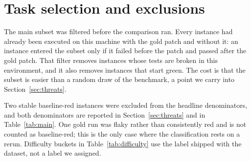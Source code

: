 \section{Task selection and exclusions}

The main subset was filtered before the comparison ran. Every instance had already been executed on this machine with the gold patch and without it: an instance entered the subset only if it failed before the patch and passed after the gold patch. That filter removes instances whose tests are broken in this environment, and it also removes instances that start green. The cost is that the subset is easier than a random draw of the benchmark, a point we carry into Section~\ref{sec:threats}.

Two stable baseline-red instances were excluded from the headline denominators, and both denominators are reported in Section~\ref{sec:threats} and in Table~\ref{tab:main}. One gold run was flaky rather than consistently red and is not counted as baseline-red; this is the only case where the classification rests on a rerun. Difficulty buckets in Table~\ref{tab:difficulty} use the label shipped with the dataset, not a label we assigned.
